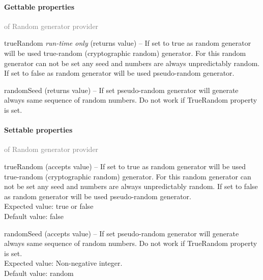 	\paragraph{Gettable properties}\textcolor{gray}{of Random generator provider}
	\begin{description*}
		\item[trueRandom]
 \textit{run-time only} 		(returns value)
			-- If set to true as random generator will be used
            true-random (cryptographic random) generator.
            For this random generator can not be set any seed and numbers are
            always unpredictably random.
            If set to false as random generator will be used pseudo-random generator.
		\item[randomSeed]
		(returns value)
			-- If set pseudo-random generator will generate always same sequence of random numbers.
            Do not work if TrueRandom property is set.
	\end{description*}
	\paragraph{Settable properties}\textcolor{gray}{of Random generator provider}
	\begin{description*}
		\item[trueRandom]
		(accepts value)
			-- If set to true as random generator will be used
            true-random (cryptographic random) generator.
            For this random generator can not be set any seed and numbers are
            always unpredictably random.
            If set to false as random generator will be used pseudo-random generator.
			\\ Expected value: true or false
			\\ Default value: false
		\item[randomSeed]
		(accepts value)
			-- If set pseudo-random generator will generate always same sequence of random numbers.
            Do not work if TrueRandom property is set.
			\\ Expected value: Non-negative integer.
			\\ Default value: random
	\end{description*}

